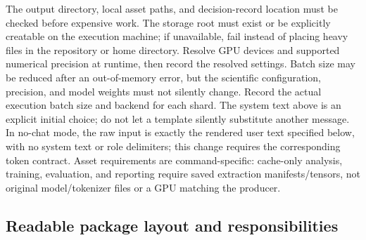\documentclass[11pt]{article}
\begin{document}
The output directory, local asset paths, and decision-record location must be checked before expensive work.
The storage root must exist or be explicitly creatable on the execution machine; if unavailable, fail instead of placing heavy files in the repository or home directory.
Resolve GPU devices and supported numerical precision at runtime, then record the resolved settings.
Batch size may be reduced after an out-of-memory error, but the scientific configuration, precision, and model weights must not silently change.
Record the actual execution batch size and backend for each shard.
The system text above is an explicit initial choice; do not let a template silently substitute another message.
In no-chat mode, the raw input is exactly the rendered user text specified below, with no system text or role delimiters; this change requires the corresponding token contract.
Asset requirements are command-specific: cache-only analysis, training, evaluation, and reporting require saved extraction manifests/tensors, not original model/tokenizer files or a GPU matching the producer.

\subsection{Readable package layout and responsibilities}
\end{document}
